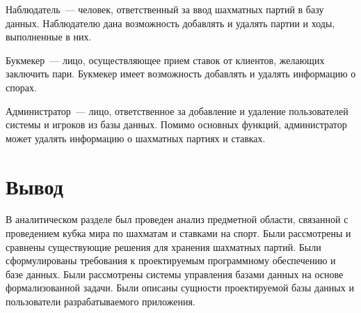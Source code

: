 Наблюдатель~--- человек, ответственный за ввод шахматных партий в базу данных. Наблюдателю дана возможность добавлять и удалять партии и ходы, выполненные в них.

Букмекер~--- лицо, осуществляющее прием ставок от клиентов, желающих заключить пари. Букмекер имеет возможность добавлять и удалять информацию о спорах.

Администратор~--- лицо, ответственное за добавление и удаление пользователей системы и игроков из базы данных. Помимо основных функций, администратор может удалять информацию о шахматных партиях и ставках.

\section*{Вывод}

В аналитическом разделе был проведен анализ предметной области, связанной с проведением кубка мира по шахматам и ставками на спорт. Были рассмотрены и сравнены существующие решения для хранения шахматных партий. Были сформулированы требования к проектируемым программному обеспечению и базе данных. Были рассмотрены системы управления базами данных на основе формализованной задачи. Были описаны сущности проектируемой базы данных и пользователи разрабатываемого приложения.

\clearpage
